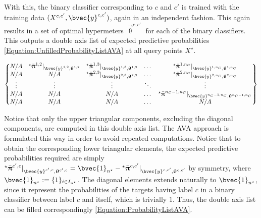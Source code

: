 				With this, the binary classifier corresponding to $c$ and $c'$ is trained with the training data $(X^{c, c'}, \bvec{y}^{c, c'})$, again in an independent fashion. This again results in a set of optimal hypermeters $\vec{\uptheta}^{c, c'}$ for each of the binary classifiers. This outputs a double axis list of expected predictive probabilities \eqref{Equation:UnfilledProbabilityListAVA} at all query points $X^{\star}$.
				
				\begin{equation}
					\begin{Bmatrix*}
						N/A & {^{\star}}\bar{\vec{\uppi}}^{1, 2} |_{\bvec{y}^{1, 2}, \vec{\uptheta}^{1, 2}} & {^{\star}}\bar{\vec{\uppi}}^{1, 3} |_{\bvec{y}^{1, 3}, \vec{\uptheta}^{1, 3}} & \dots & {^{\star}}\bar{\vec{\uppi}}^{1, n_{C}} |_{\bvec{y}^{1, n_{C}}, \vec{\uptheta}^{1, n_{C}}} \\
						N/A & N/A & {^{\star}}\bar{\vec{\uppi}}^{2, 3} |_{\bvec{y}^{2, 3}, \vec{\uptheta}^{2, 3}} & \dots & {^{\star}}\bar{\vec{\uppi}}^{2, n_{C}} |_{\bvec{y}^{2, n_{C}}, \vec{\uptheta}^{2, n_{C}}} \\
						\vdots & \vdots & \vdots & \ddots & \vdots \\
						N/A & N/A & N/A & \dots & {^{\star}}\bar{\vec{\uppi}}^{n_{C} - 1, n_{C}} |_{\bvec{y}^{n_{C} - 1, n_{C}}, \vec{\uptheta}^{n_{C} - 1, n_{C}}} \\
						N/A & N/A & N/A & \dots & N/A
					\end{Bmatrix*} 
				\label{Equation:UnfilledProbabilityListAVA}
				\end{equation}				
							
				Notice that only the upper triangular components, excluding the diagonal components, are computed in this double axis list. The AVA approach is formulated this way in order to avoid repeated computations. Notice that to obtain the corresponding lower triangular elements, the expected predictive probabilities required are simply ${^{\star}}\bar{\vec{\uppi}}^{c', c} |_{\bvec{y}^{c', c}, \vec{\uptheta}^{c', c}} = \bvec{1}_{n^{\star}} - {^{\star}}\bar{\vec{\uppi}}^{c, c'} |_{\bvec{y}^{c, c'}, \vec{\uptheta}^{c, c'}}$ by symmetry, where $\bvec{1}_{n^{\star}} := \{1\}_{i \in I_{n^{\star}}}$. The diagonal elements extends naturally to $\bvec{1}_{n^{\star}}$, since it represent the probabilities of the targets having label $c$ in a binary classifier between label $c$ and itself, which is trivially $1$. Thus, the double axis list can be filled correspondingly \eqref{Equation:ProbabilityListAVA}.
				
